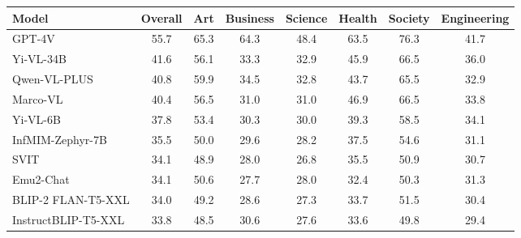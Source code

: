 \begin{table}[t!]
\centering
\begin{tabular}{@{}lccccccc@{}}
\toprule
\textbf{Model}          & \textbf{Overall} & \textbf{Art} & \textbf{Business} & \textbf{Science} & \textbf{Health} & \textbf{Society} & \textbf{Engineering} \\ \midrule
GPT-4V & 55.7             & 65.3                   & 64.3              & 48.4             & 63.5                        & 76.3                         & 41.7                   \\
Yi-VL-34B               & 41.6             & 56.1                   & 33.3              & 32.9             & 45.9                        & 66.5                         & 36.0                   \\
Qwen-VL-PLUS            & 40.8             & 59.9                   & 34.5              & 32.8             & 43.7                        & 65.5                         & 32.9                   \\
Marco-VL                & 40.4             & 56.5                   & 31.0              & 31.0             & 46.9                        & 66.5                         & 33.8                   \\
Yi-VL-6B                & 37.8             & 53.4                   & 30.3              & 30.0             & 39.3                        & 58.5                         & 34.1                   \\
InfMIM-Zephyr-7B        & 35.5             & 50.0                   & 29.6              & 28.2             & 37.5                        & 54.6                         & 31.1                   \\
SVIT                    & 34.1             & 48.9                   & 28.0              & 26.8             & 35.5                        & 50.9                         & 30.7                   \\
Emu2-Chat               & 34.1             & 50.6                   & 27.7              & 28.0             & 32.4                        & 50.3                         & 31.3                   \\
BLIP-2 FLAN-T5-XXL       & 34.0             & 49.2                   & 28.6              & 27.3             & 33.7                        & 51.5                         & 30.4                   \\
InstructBLIP-T5-XXL      & 33.8             & 48.5                   & 30.6              & 27.6             & 33.6                        & 49.8                         & 29.4                   \\

\end{tabular}
\end{table}
